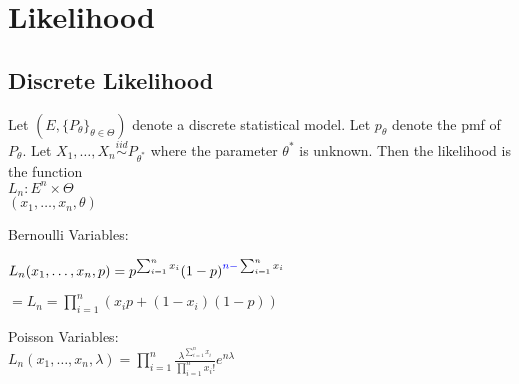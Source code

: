 \section{Likelihood}

\subsection*{Discrete Likelihood}

Let $(E, \{ P_\theta \} _{\theta \in \Theta })$ denote a discrete statistical model. Let $p_\theta$ denote the pmf of $P_\theta$. Let $X_1, \ldots , X_ n \stackrel{iid}{\sim } P_{\theta ^*}$ where the parameter $\theta ^*$  is unknown. Then the likelihood is the function \\

$\displaystyle  L_ n: E^ n \times \Theta$\\
$\displaystyle (x_1, \ldots , x_ n, \theta )$

Bernoulli Variables:

$L_ n(x_1, \ldots , x_ n, p) = p^{\sum _{i = 1}^ n x_ i} (1 -p)^{{\color{blue}{n - }} \sum _{i = 1}^ n x_ i}$

$= L_ n = \prod _{i = 1}^ n \left( x_ i p + (1 - x_ i) (1 - p) \right)$

Poisson Variables:\\

$L_ n(x_1, \ldots , x_ n, \lambda) = \prod _{i = 1}^ n \frac{\lambda^{\sum_{i=1}^{n} x_i}}{\prod _{i = 1}^ n x_i!} e^{n\lambda}$\\